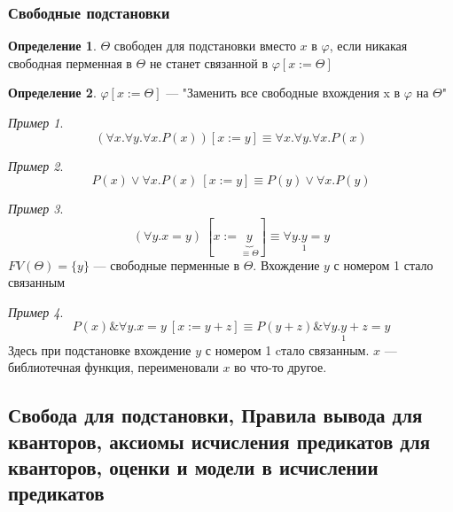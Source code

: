 \documentclass[english]{article}
\theoremstyle{plain}
\theoremstyle{remark}
\newtheorem*{examp}{Пример}
\theoremstyle{definition}
\newtheorem*{definition}{Определение}
\begin{document}
\subsubsection{Свободные подстановки}
\label{sec:orgcb7cb2f}
\begin{definition}
\(\Theta\) свободен для подстановки вместо \(x\) в \(\varphi\), если никакая свободная перменная в \(\Theta\) не станет связанной в \(\varphi[x := \Theta]\)
\end{definition}
\begin{definition}
\(\varphi[x := \Theta]\) --- "Заменить все свободные вхождения x в \(\varphi\) на \(\Theta\)"
\end{definition}
\begin{examp}
\[ (\forall x. \forall y. \forall x. P(x))[x := y] \equiv \forall x. \forall y. \forall x. P(x) \]
\end{examp}
\begin{examp}
\[ P(x) \vee \forall x. P(x)\ [x := y] \equiv P(y) \vee \forall x. P(y) \]
\end{examp}
\begin{examp}
\[ (\forall y. x = y)\ [x := \underbrace{y}_{\equiv \Theta}] \equiv \forall y. \underset{1}{y} = y\]
\(FV(\Theta) = \{y\}\) --- свободные перменные в \(\Theta\). Вхождение \(y\) с номером 1 стало связанным
\end{examp}
\begin{examp}
\[ P(x) \& \forall y. x = y\ [x := y + z] \equiv P(y + z) \& \forall y. \underset{1}{y} + z = y \]
Здесь при подстановке вхождение \(y\) с номером 1 cтало связанным. \(x\) --- библиотечная функция, переименовали \(x\) во что-то другое.
\end{examp}
\subsection{Свобода для подстановки, Правила вывода для кванторов, аксиомы исчисления предикатов для кванторов, оценки и модели в исчислении предикатов}
\label{sec:org2f18530}
\end{document}
